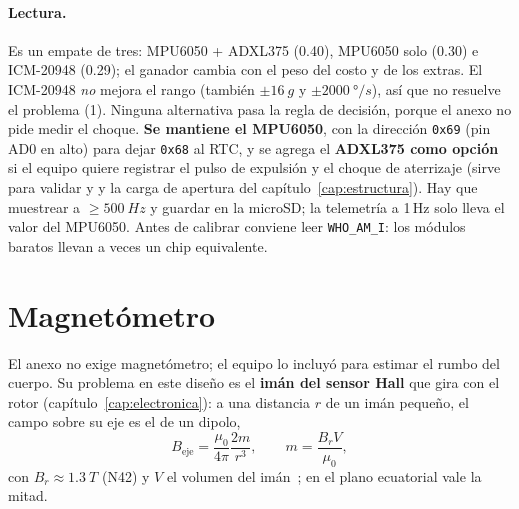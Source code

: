 \begin{table}[H]
\centering\small
\caption{Decisión de la IMU.}\label{tab:sens-imu}

\end{table}

\paragraph{Lectura.} Es un empate de tres: MPU6050 + ADXL375 (\num{0.40}), MPU6050 solo
(\num{0.30}) e ICM-20948 (\num{0.29}); el ganador cambia con el peso del costo y de los extras.
El ICM-20948 \emph{no} mejora el rango (también $\pm\SI{16}{g}$ y $\pm\SI{2000}{\degree/s}$),
así que no resuelve el problema (1). Ninguna alternativa pasa la regla de decisión, porque el
anexo no pide medir el choque. \textbf{Se mantiene el MPU6050}, con la dirección
\texttt{0x69} (pin AD0 en alto) para dejar \texttt{0x68} al RTC, y se agrega el \textbf{ADXL375
como opción} si el equipo quiere registrar el pulso de expulsión y el choque de aterrizaje
(sirve para validar  y  y la carga de apertura del capítulo~\ref{cap:estructura}).
Hay que muestrear a $\ge\SI{500}{Hz}$ y guardar en la microSD; la telemetría a 1\,Hz solo lleva
el valor del MPU6050. Antes de calibrar conviene leer \texttt{WHO\_AM\_I}: los módulos baratos
llevan a veces un chip equivalente.

\section{Magnetómetro}\label{sec:sens-mag}

El anexo no exige magnetómetro; el equipo lo incluyó para estimar el rumbo del cuerpo. Su
problema en este diseño es el \textbf{imán del sensor Hall} que gira con el rotor
(capítulo~\ref{cap:electronica}): a una distancia $r$ de un imán pequeño, el campo sobre su eje es el de un
dipolo,
\begin{equation}
  B_{\text{eje}}=\frac{\mu_0}{4\pi}\frac{2m}{r^3},\qquad m=\frac{B_r V}{\mu_0},
  \label{eq:sens-dipolo}
\end{equation}
con $B_r\approx\SI{1.3}{T}$ (N42)\nv{} y $V$ el volumen del imán~\cite{sensores-jackson1999}; en el
plano ecuatorial vale la mitad.

